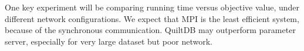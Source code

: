\documentclass{acm_proc_article-sp}
\begin{document}
One key experiment will be comparing running time versus objective value, under
different network configurations. We expect that MPI is the least efficient
system, because of the synchronous communication. QuiltDB may outperform
parameter server, especially for very large dataset but poor network.




\end{document}
